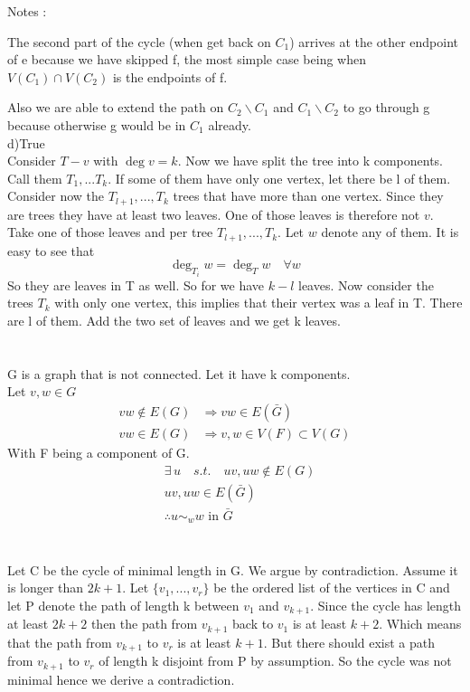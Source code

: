 \documentclass{article}
\begin{document}
	Notes : 
	
	The second part of the cycle (when get back on $C_1$) arrives at the other endpoint of e because we have skipped f, the most simple case being when $V(C_1) \cap V(C_2)$ is the endpoints of f. 
	
	Also we are able to extend the path on $C_2\backslash C_1$ and $C_1 \backslash C_2$ to go through g because otherwise g would be in $C_1$ already.
	\\[2ex]
	d)True\\
	Consider $T-v$ with $\deg v = k$. Now we have split the tree into k components. Call them $T_1,...T_k$. If some of them have only one vertex, let there be l of them. Consider now the $T_{l+1},...,T_{k}$ trees that have more than one vertex. Since they are trees they have at least two leaves. One of those leaves is therefore not $v$. Take one of those leaves and per tree $T_{l+1},...,T_{k}$. Let $w$ denote any of them. It is easy to see that
	\begin{equation}
		\deg_{T_i} w = \deg_T w \quad \forall w
	\end{equation}
	So they are leaves in T as well. So for we have $k-l$ leaves. Now consider the trees $T_k$ with only one vertex, this implies that their vertex was a leaf in T. There are l of them. Add the two set of leaves and we get k leaves.\\
	\clearpage
	\section{}
	G is a graph that is not connected. Let it have k components. \\
	Let $v,w \in G$
	\begin{align*}
		vw \notin E(G) &\Rightarrow vw \in E(\bar{G})\\
		vw \in E(G) &\Rightarrow v,w \in V(F) \subset V(G) 
	\end{align*}
	With F being a component of G.\\
	\begin{align*}
		&\exists \, u \quad s.t. \quad uv ,uw \notin E(G)\\
		&uv,uw \in E(\bar{G}) \\
		&\therefore u \sim_w w \text{ in } \bar{G} 
	\end{align*}
	\section{}
	
	Let C be the cycle of minimal length in G. We argue by contradiction. Assume it is longer than $2k+1$. Let $\{v_1,...,v_{r}\}$ be the ordered list of the vertices in C and let P denote the path of length k between $v_1$ and $v_{k+1}$. Since the cycle has length at least $2k+2$ then the path from $v_{k+1}$ back to $v_1$ is at least $k+2$. Which means that the path from $v_{k+1}$ to $v_r$ is at least $k+1$. But there should exist a path from $v_{k+1}$ to $v_{r}$ of length k disjoint from P by assumption. So the cycle was not minimal hence we derive a contradiction.
	
\end{document}
